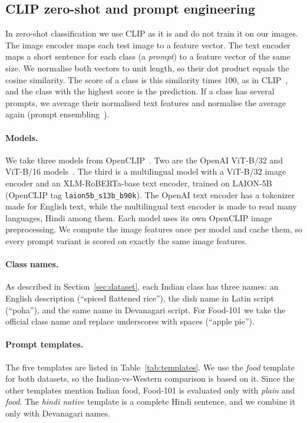 \documentclass[twoside,a4paper,11pt]{article}
\begin{document}
\subsection{CLIP zero-shot and prompt engineering}\label{sec:zs-method}   %
In zero-shot classification we use CLIP as it is and do not train it on our images. The image encoder maps each test
image to a feature vector. The text encoder maps a short sentence for each class (a \emph{prompt}) to a feature vector
of the same size. We normalise both vectors to unit length, so their dot product equals the cosine similarity. The
score of a class is this similarity times 100, as in CLIP~\cite{radford2021clip}, and the class with the highest score
is the prediction. If a class has several prompts, we average their normalised text features and normalise the average
again (prompt ensembling~\cite{radford2021clip}).

\paragraph{Models.} We take three models from OpenCLIP~\cite{cherti2023openclip}. Two are the OpenAI ViT-B/32 and
ViT-B/16 models~\cite{radford2021clip}. The third is a multilingual model with a ViT-B/32 image encoder and an
XLM-RoBERTa-base text encoder, trained on LAION-5B~\cite{schuhmann2022laion5b} (OpenCLIP tag
\texttt{laion5b\_s13b\_b90k}). The OpenAI text encoder has a tokenizer made for English text, while the multilingual
text encoder is made to read many languages, Hindi among them. Each model uses its own OpenCLIP image preprocessing. We
compute the image features once per model and cache them, so every prompt variant is scored on exactly the same image
features.

\paragraph{Class names.} As described in Section~\ref{sec:dataset}, each Indian class has three names: an English
description (``spiced flattened rice''), the dish name in Latin script (``poha''), and the same name in Devanagari
script. For Food-101 we take the official class name and replace underscores with spaces (``apple pie'').

\paragraph{Prompt templates.} The five templates are listed in Table~\ref{tab:templates}. We use the \emph{food}
template for both datasets, so the Indian-vs-Western comparison is based on it. Since the other templates mention
Indian food, Food-101 is evaluated only with \emph{plain} and \emph{food}. The \emph{hindi native} template is a
complete Hindi sentence, and we combine it only with Devanagari names.
\end{document}
